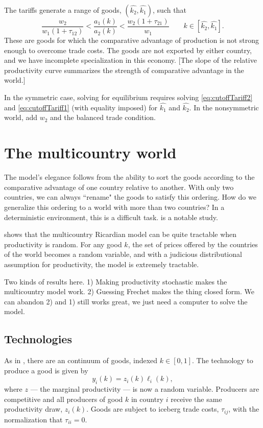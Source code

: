\documentclass[11pt, pdftex]{article}
\begin{document}
The tariffs generate a range of goods, $(\widehat{k_2},\widehat{k_1})$, such that
\begin{equation}
  \frac{w_2}{w_1(1+\tau_{12})}<\frac{a_1(k)}{a_2(k)}  < \frac{w_2(1+\tau_{21})}{w_1} \qquad k \in [\hat{k_2},\hat{k_1}].
\end{equation}
These are goods for which the comparative advantage of production is not strong enough to overcome trade costs.  The goods are not exported by either country, and we have incomplete specialization in this economy. [The slope of the relative productivity curve summarizes the strength of comparative advantage in the world.]

In the symmetric case, solving for equilibrium requires solving \eqref{eq:cutoffTariff2} and \eqref{eq:cutoffTariff1} (with equality imposed) for $\widehat{k_1}$ and $\widehat{k_2}$. In the nonsymmetric world, add $w_2$ and the balanced trade condition.

\section{The multicountry world}
The \citet{dornbusch} model's elegance follows from the ability to sort the goods according to the comparative advantage of one country relative to another.  With only two countries, we can always ``rename" the goods to satisfy this ordering.  How do we generalize this ordering to a world with more than two countries? In a deterministic environment, this is a difficult task. \citet{wilson} is a notable study.

\citet{EK02} shows that the multicountry Ricardian model can be quite tractable when productivity is random.  For any good $k$, the set of prices offered by the countries of the world becomes a random variable, and with a judicious distributional assumption for productivity, the model is extremely tractable.

Two kinds of results here. 1) Making productivity stochastic makes the multicountry model work. 2) Guessing Frechet makes the thing closed form.  We can abandon 2) and 1) still works great, we just need a computer to solve the model.

\subsection*{Technologies}
As in \citet{dornbusch}, there are an continuum of goods, indexed $k \in [0,1]$.  The technology to produce a good is given by
\begin{equation}\label{eq:ekProduction}
    y_i(k)=z_i(k)\ell_i(k),
\end{equation}
where $z$ --- the marginal productivity --- is now a random variable.  Producers are competitive and all producers of good $k$ in country $i$ receive the same productivity draw, $z_i(k)$.  Goods are subject to iceberg trade costs, $\tau_{ij}$, with the normalization that $\tau_{ii}=0$.
\end{document}
